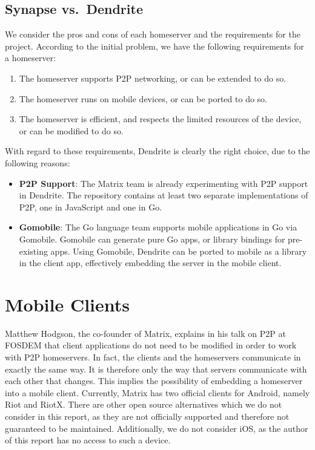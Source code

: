 \subsection{Synapse vs.~Dendrite}\label{sec:synapse_vs_dendrite}
We consider the pros and cons of each homeserver and the requirements for the project.
According to the initial problem, we have the following requirements for a homeserver:
\begin{enumerate}
      \item{
            The homeserver supports \ac{P2P} networking, or can be extended to do so.
            }
      \item{
            The homeserver runs on mobile devices, or can be ported to do so.
            }
      \item{
            The homeserver is efficient, and respects the limited resources of the device, or can be modified to do so.
            }
\end{enumerate}
With regard to these requirements, Dendrite is clearly the right choice, due to the following reasons:
\begin{itemize}
      \item{
            \textbf{\ac{P2P} Support}:
            The Matrix team is already experimenting with \ac{P2P} support in Dendrite.
            The repository contains at least two separate implementations of \ac{P2P}, one in JavaScript and one in Go\cite{fosdem_event_p2p_matrix}.
            }
      \item{
            \textbf{Gomobile}:
            The Go language team supports mobile applications in Go via Gomobile\cite{gomobile}.
            Gomobile can generate pure Go apps, or library bindings for pre-existing apps.
            Using Gomobile, Dendrite can be ported to mobile as a library in the client app, effectively embedding the server in the mobile client.
            }
\end{itemize}

\section{Mobile Clients}\label{sec:official_clients}
Matthew Hodgson, the co-founder of Matrix, explains in his talk on \ac{P2P} at FOSDEM\cite{fosdem_event_p2p_matrix} that client applications do not need to be modified in order to work with \ac{P2P} homeservers.
In fact, the clients and the homeservers communicate in exactly the same way.
It is therefore only the way that servers communicate with each other that changes.
This implies the possibility of embedding a homeserver into a mobile client.
Currently, Matrix has two official clients for Android, namely Riot and RiotX.
There are other open source alternatives which we do not consider in this report, as they are not officially supported and therefore not guaranteed to be maintained.
Additionally, we do not consider iOS, as the author of this report has no access to such a device.

